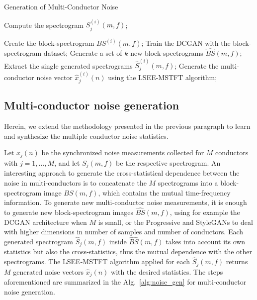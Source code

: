 \begin{algorithm}
	\caption{Generation of Multi-Conductor Noise}
	\label{alg:noise_gen}
	\begin{algorithmic}[1]
		\State Compute the spectrogram $S_j^{(i)}(m,f)$;
		\EndFor

		\State Create the block-spectrogram $BS^{(i)}(m,f)$;
		\EndFor
		\State Train the DCGAN with the block-spectrogram dataset;
		\State Generate a set of $k$ new block-spectrograms $\hat{BS}(m,f)$;
		\State Extract the single generated spectrograms $\hat{S}_j^{(i)}(m,f)$;
		\State Generate the multi-conductor noise vector $\hat{x}^{(i)}_j(n)$ 
		\State using the LSEE-MSTFT algorithm;
		\EndFor
		\EndFor
	\end{algorithmic}
\end{algorithm}

\subsection{Multi-conductor noise generation}
Herein, we extend the methodology presented in the previous paragraph to learn and synthesize the multiple conductor noise statistics.

Let $x_j(n)$ be the synchronized noise measurements collected for $M$ conductors with $j=1,\dots,M$, and let $S_j(m,f)$ be the respective spectrogram. An interesting approach to generate the cross-statistical dependence between the noise in multi-conductors is to concatenate the $M$ spectrograms into a block-spectrogram image $BS(m,f)$, which contains the mutual time-frequency information. To generate new multi-conductor noise measurements, it is enough to generate new block-spectrogram images $\hat{BS}(m,f)$, using for example the DCGAN architecture when $M$ is small, or the Progressive and StyleGANs \cite{karras2018progressive, Karras2019} to deal with higher dimensions in number of samples and number of conductors. Each generated spectrogram $\hat{S}_j(m,f)$ inside $\hat{BS}(m,f)$ takes into account its own statistics but also the cross-statistics, thus the mutual dependence with the other spectrograms. The LSEE-MSTFT algorithm applied for each $\hat{S}_j(m,f)$ returns $M$ generated noise vectors $\hat{x}_j(n)$ with the desired statistics.
The steps aforementioned are summarized in the Alg.~\ref{alg:noise_gen} for multi-conductor noise generation. 

